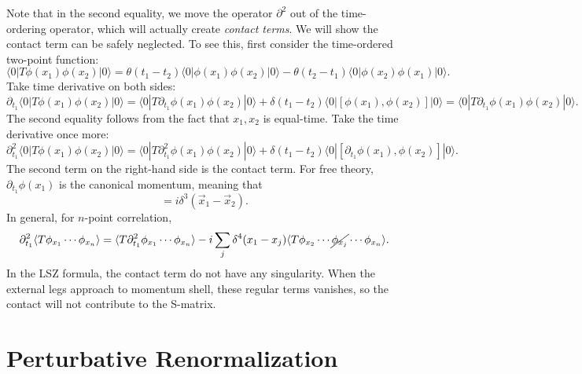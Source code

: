 \documentclass[aps,prb,superscriptaddress,nofootinbib]{revtex4}
\begin{document}
Note that in the second equality, we move the operator $\partial^2$ out of the time-ordering operator, which will actually create \textit{contact terms}.
We will show the contact term can be safely neglected.
To see this, first consider the time-ordered two-point function:
\begin{equation}
	\langle 0|T\phi(x_1)\phi(x_2)|0\rangle
	= \theta(t_1-t_2)\langle 0|\phi(x_1)\phi(x_2)|0\rangle -
	\theta(t_2-t_1)\langle 0|\phi(x_2)\phi(x_1)|0\rangle.
\end{equation}	
Take time derivative on both sides:
\begin{equation*}
	\partial_{t_1} \langle 0|T\phi(x_1)\phi(x_2)|0\rangle
	= \langle 0|T\partial_{t_1}\phi(x_1)\phi(x_2)|0\rangle +
	\delta(t_1-t_2)\langle 0|[\phi(x_1),\phi(x_2)]|0\rangle 
	= \langle 0|T\partial_{t_1}\phi(x_1)\phi(x_2)|0\rangle.
\end{equation*}
The second equality follows from the fact that $x_1,x_2$ is equal-time.
Take the time derivative once more:
\begin{equation*}
	\partial^2_{t_1} \langle 0|T\phi(x_1)\phi(x_2)|0\rangle
	= \langle 0|T\partial^2_{t_1}\phi(x_1)\phi(x_2)|0\rangle +
	\delta(t_1-t_2)\langle 0|[\partial_{t_1}\phi(x_1),\phi(x_2)]|0\rangle.
\end{equation*}
The second term on the right-hand side is the contact term.
For free theory, $\partial_{t_1}\phi(x_1)$ is the canonical momentum, meaning that
\begin{equation}
	[\phi(\vec x_1, t),\partial_{t}\phi(\vec x_1,t)] = i \delta^{3}(\vec x_1-\vec x_2).
\end{equation}
In general, for $n$-point correlation,
\begin{equation}
\begin{aligned}
	 \partial_{t_1}^2 \langle T\phi_{x_1}\cdots\phi_{x_n} \rangle
	= \langle T\partial_{t_1}^2\phi_{x_1}\cdots\phi_{x_n}\rangle -i \sum_j \delta^4(x_1-x_j) \langle T \phi_{x_2}\cdots\cancel{\phi_{x_j}}\cdots\phi_{x_n} \rangle.
\end{aligned}
\end{equation}
In the LSZ formula, the contact term do not have any singularity.
When the external legs approach to momentum shell, these regular terms vanishes, so the contact will not contribute to the S-matrix.



\section{Perturbative Renormalization}
\end{document}

